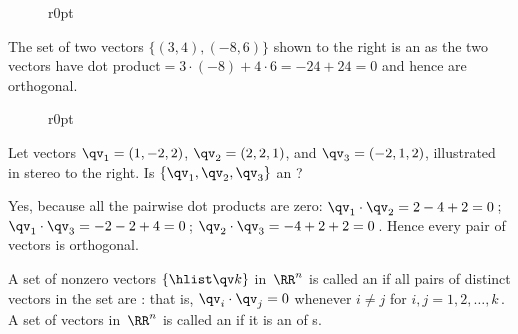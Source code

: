 \begin{wrapfigure}r{0pt} 
\end{wrapfigure}
\begin{example} \label{eg:orthogduo}
The set of two vectors \(\{(3,4),(-8,6)\}\) shown to the right
is an  as the two vectors have dot product\({}=3\cdot(-8)+4\cdot6=-24+24=0\) and hence are orthogonal.
\end{example}


\begin{example} \label{eg:orthogtrio}
\begin{wrapfigure}r{0pt}
\end{wrapfigure}
Let vectors \(\qv_1=(1,-2,2)\), \(\qv_2=(2,2,1)\), and \(\qv_3=(-2,1,2)\), illustrated in stereo to the right. 
Is \(\{\qv_1,\qv_2,\qv_3\}\) an ?

\begin{solution} 
Yes, because all the pairwise dot products are zero: \(\qv_1\cdot\qv_2=2-4+2=0\)\,; \(\qv_1\cdot\qv_3=-2-2+4=0\)\,; \(\qv_2\cdot\qv_3=-4+2+2=0\)\,. 
Hence every pair of vectors is orthogonal. 
\aqed

\end{solution}
\end{example}



\begin{definition} \label{def:orthoset} 
A set of nonzero vectors \(\{\hlist\qv k\}\) in~\(\RR^n\) is called an  if all pairs of distinct vectors in the set are : that is, \(\qv_i\cdot\qv_j=0\) whenever \(i\neq j\) for \(i,j=1,2,\ldots,k\)\,.
A set of vectors in~\(\RR^n\) is called an  if it is an  of s.
\end{definition}


